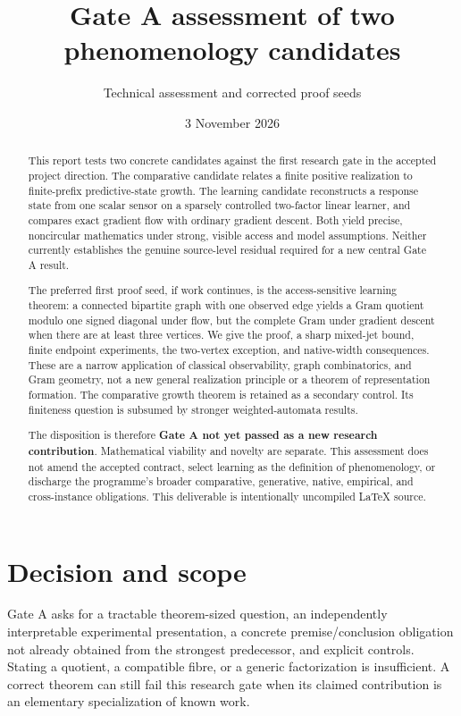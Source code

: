 \documentclass[11pt]{article}
\title{Gate A assessment of two phenomenology candidates}
\author{Technical assessment and corrected proof seeds}
\date{3 November 2026}
\theoremstyle{remark}
\begin{document}
\maketitle
\begin{abstract}
This report tests two concrete candidates against the first research gate in the accepted project direction. The comparative candidate relates a finite positive realization to finite-prefix predictive-state growth. The learning candidate reconstructs a response state from one scalar sensor on a sparsely controlled two-factor linear learner, and compares exact gradient flow with ordinary gradient descent. Both yield precise, noncircular mathematics under strong, visible access and model assumptions. Neither currently establishes the genuine source-level residual required for a new central Gate A result.

The preferred first proof seed, if work continues, is the access-sensitive learning theorem: a connected bipartite graph with one observed edge yields a Gram quotient modulo one signed diagonal under flow, but the complete Gram under gradient descent when there are at least three vertices. We give the proof, a sharp mixed-jet bound, finite endpoint experiments, the two-vertex exception, and native-width consequences. These are a narrow application of classical observability, graph combinatorics, and Gram geometry, not a new general realization principle or a theorem of representation formation. The comparative growth theorem is retained as a secondary control. Its finiteness question is subsumed by stronger weighted-automata results.

The disposition is therefore \textbf{Gate A not yet passed as a new research contribution}. Mathematical viability and novelty are separate. This assessment does not amend the accepted contract, select learning as the definition of phenomenology, or discharge the programme's broader comparative, generative, native, empirical, and cross-instance obligations. This deliverable is intentionally uncompiled \LaTeX{} source.
\end{abstract}
\tableofcontents

\section{Decision and scope}
\label{sec:decision}

Gate A asks for a tractable theorem-sized question, an independently interpretable experimental presentation, a concrete premise/conclusion obligation not already obtained from the strongest predecessor, and explicit controls. Stating a quotient, a compatible fibre, or a generic factorization is insufficient. A correct theorem can still fail this research gate when its claimed contribution is an elementary specialization of known work.
\end{document}
